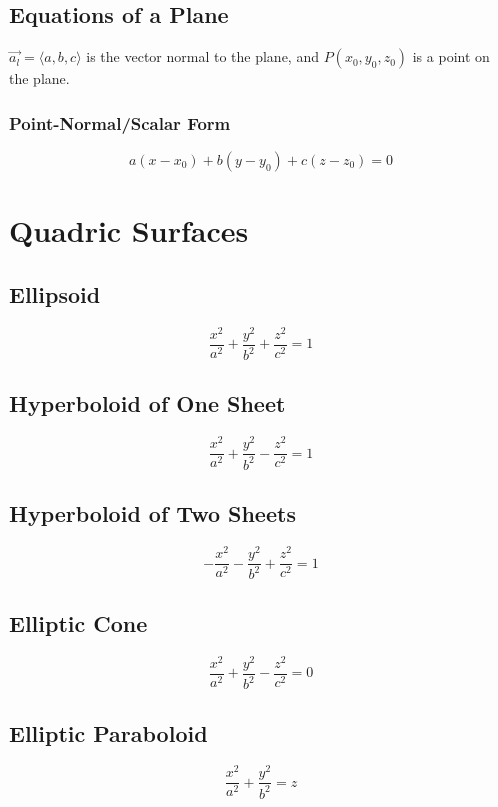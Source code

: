 \documentclass[a4paper,12pt,openany]{book}
\begin{document}
\subsection{Equations of a Plane}
\(\vec{a_l} = \langle a, b, c \rangle\) is the vector normal to the plane, and \(P(x_0, y_0, z_0)\) is a point on the plane.
\subsubsection{Point-Normal/Scalar Form}
\begin{equation}
    a(x-x_0) + b(y-y_0) + c(z-z_0) = 0
\end{equation}

\section{Quadric Surfaces}

\subsection{Ellipsoid}
\begin{equation}
    \dfrac{x^2}{a^2} + \dfrac{y^2}{b^2} + \dfrac{z^2}{c^2} = 1
\end{equation}

\subsection{Hyperboloid of One Sheet}
\begin{equation}
    \dfrac{x^2}{a^2} + \dfrac{y^2}{b^2} - \dfrac{z^2}{c^2} = 1
\end{equation}

\subsection{Hyperboloid of Two Sheets}
\begin{equation}
    -\dfrac{x^2}{a^2} - \dfrac{y^2}{b^2} + \dfrac{z^2}{c^2} = 1
\end{equation}

\subsection{Elliptic Cone}
\begin{equation}
    \dfrac{x^2}{a^2} + \dfrac{y^2}{b^2} - \dfrac{z^2}{c^2} = 0
\end{equation}

\subsection{Elliptic Paraboloid}
\begin{equation}
    \dfrac{x^2}{a^2} + \dfrac{y^2}{b^2} = z
\end{equation}
\end{document}
